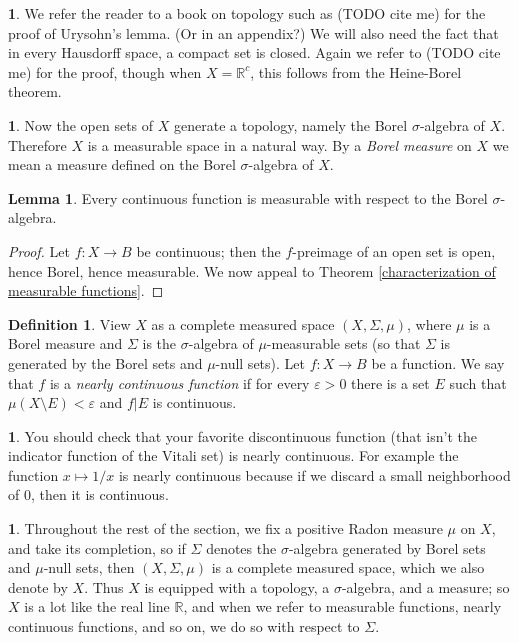 \documentclass[12pt]{book}
\newcommand{\RR}{\mathbb{R}}
\newcommand{\dfn}[1]{\emph{#1}\index{#1}}
\theoremstyle{definition}
\newtheorem{lemma}[theorem]{Lemma}
\newtheorem{subsec}[theorem]{}
\newtheorem{definition}[theorem]{Definition}
\begin{document}
\begin{subsec}
We refer the reader to a book on topology such as (TODO cite me) for the proof of Urysohn's lemma. (Or in an appendix?)
We will also need the fact that in every Hausdorff space, a compact set is closed. Again we refer to (TODO cite me) for the proof, though when $X = \RR^c$, this follows from the Heine-Borel theorem.
\end{subsec}

\begin{subsec}
Now the open sets of $X$ generate a topology, namely the Borel $\sigma$-algebra of $X$. Therefore $X$ is a measurable space in a natural way.
By a \dfn{Borel measure} on $X$ we mean a measure defined on the Borel $\sigma$-algebra of $X$.
\end{subsec}

\begin{lemma}
Every continuous function is measurable with respect to the Borel $\sigma$-algebra.
\end{lemma}
\begin{proof}
Let $f: X \to B$ be continuous; then the $f$-preimage of an open set is open, hence Borel, hence measurable.
We now appeal to Theorem \ref{characterization of measurable functions}.
\end{proof}

\begin{definition}
View $X$ as a complete measured space $(X, \Sigma, \mu)$, where $\mu$ is a Borel measure and $\Sigma$ is the $\sigma$-algebra of $\mu$-measurable sets (so that $\Sigma$ is generated by the Borel sets and $\mu$-null sets).
Let $f: X \to B$ be a function.
We say that $f$ is a \dfn{nearly continuous function} if for every $\varepsilon > 0$ there is a set $E$ such that $\mu(X \setminus E) < \varepsilon$ and $f|E$ is continuous.
\end{definition}

\begin{subsec}
You should check that your favorite discontinuous function (that isn't the indicator function of the Vitali set) is nearly continuous.
For example the function $x \mapsto 1/x$ is nearly continuous because if we discard a small neighborhood of $0$, then it is continuous.
\end{subsec}

\begin{subsec}
Throughout the rest of the section, we fix a positive Radon measure $\mu$ on $X$, and take its completion, so if $\Sigma$ denotes the $\sigma$-algebra generated by Borel sets and $\mu$-null sets, then $(X, \Sigma, \mu)$ is a complete measured space, which we also denote by $X$.
Thus $X$ is equipped with a topology, a $\sigma$-algebra, and a measure; so $X$ is a lot like the real line $\RR$, and when we refer to measurable functions, nearly continuous functions, and so on, we do so with respect to $\Sigma$.
\end{subsec}
\end{document}
